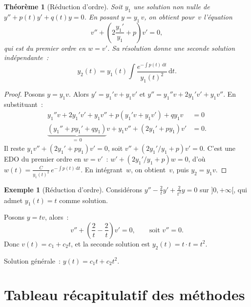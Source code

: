 \documentclass[12pt,a4paper,openany]{book}
\theoremstyle{definition}
\newtheorem{exemple}[definition]{Exemple}
\theoremstyle{plain}
\newtheorem{theoreme}[definition]{Théorème}
\theoremstyle{remark}
\newcommand{\dd}{\mathrm{d}}
\begin{document}
\begin{theoreme}[Réduction d'ordre]\label{thm:reduction-ordre}
  Soit $y_1$ une solution non nulle de $y'' + p(t)y' + q(t)y = 0$.
  En posant $y = y_1\,v$, on obtient pour~$v$ l'équation
  \begin{equation}\label{eq:reduction-ordre}
    v'' + \left(2\frac{y_1'}{y_1} + p\right)v' = 0,
  \end{equation}
  qui est du premier ordre en $w = v'$. Sa résolution donne
  une seconde solution indépendante~:
  \begin{equation}\label{eq:2e-solution}
    y_2(t) = y_1(t) \int \frac{e^{-\int p(t)\,\dd t}}{y_1(t)^2}\,\dd t.
  \end{equation}
\end{theoreme}

\begin{proof}
  Posons $y = y_1 v$. Alors $y' = y_1' v + y_1 v'$ et
  $y'' = y_1'' v + 2y_1' v' + y_1 v''$. En substituant~:
  \begin{align*}
    y_1'' v + 2y_1' v' + y_1 v'' + p(y_1' v + y_1 v') + q y_1 v &= 0 \\
    \underbrace{(y_1'' + py_1' + qy_1)}_{=\,0} v + y_1 v'' + (2y_1' + py_1)v' &= 0.
  \end{align*}
  Il reste $y_1 v'' + (2y_1' + py_1)v' = 0$, soit
  $v'' + (2y_1'/y_1 + p)v' = 0$.
  C'est une EDO du premier ordre en $w = v'$~:
  $w' + (2y_1'/y_1 + p)w = 0$, d'où
  $w(t) = \frac{C}{y_1(t)^2}\,e^{-\int p(t)\,\dd t}$.
  En intégrant~$w$, on obtient~$v$, puis $y_2 = y_1 v$.
\end{proof}

\begin{exemple}[Réduction d'ordre]\label{ex:reduction-ordre}
  Considérons $y'' - \frac{2}{t}y' + \frac{2}{t^2}y = 0$ sur
  $]0,+\infty[$, qui admet $y_1(t) = t$ comme solution.

  Posons $y = tv$, alors~:
  \[
    v'' + \left(\frac{2}{t} - \frac{2}{t}\right)v' = 0,
    \qquad\text{soit } v'' = 0.
  \]
  Donc $v(t) = c_1 + c_2 t$, et la seconde solution est
  $y_2(t) = t \cdot t = t^2$.

  Solution générale~: $y(t) = c_1 t + c_2 t^2$.
\end{exemple}

\section{Tableau récapitulatif des méthodes}\label{sec:tableau-methodes}
\end{document}
